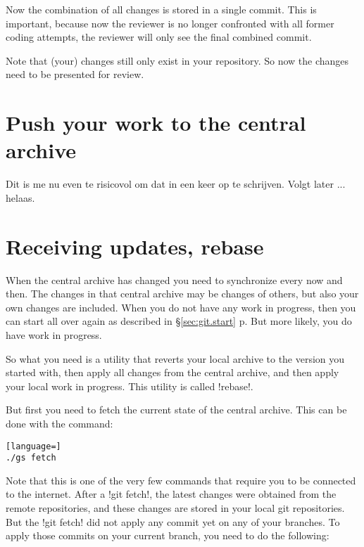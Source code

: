 \noindent
Now the combination of all changes is stored in a single commit. This is
important, because now the reviewer is no longer confronted with all former
coding attempts, the reviewer will only see the final combined commit.

Note that (your) changes still only exist in your repository. So now the
changes need to be presented for review.

\section{Push your work to the central archive}

Dit is me nu even te risicovol om dat in een keer op te schrijven. Volgt later ... helaas.

\section{Receiving updates, rebase}

When the central archive has changed you need to synchronize every now and
then. The changes in that central archive may be changes of others, but also
your own changes are included. When you do not have any work in progress, then
you can start all over again as described in \S\ref{sec:git.start}
p\pageref{sec:git.start}. But more likely, you do have work in progress.

So what you need is a utility that reverts your local archive to the version
you started with, then apply all changes from the central archive, and then
apply your local work in progress. This utility is called !rebase!.

But first you need to fetch the current state of the central archive. This can
be done with the command:


\begin{lstlisting}[language=]
./gs fetch
\end{lstlisting}

\noindent
Note that this is one of the very few commands that require you to be connected
to the internet. After a !git fetch!, the latest changes were obtained from the
remote repositories, and these changes are stored in your local git
repositories. But the !git fetch! did not apply any commit yet on any of your
branches. To apply those commits on your current branch, you need to do the
following:

